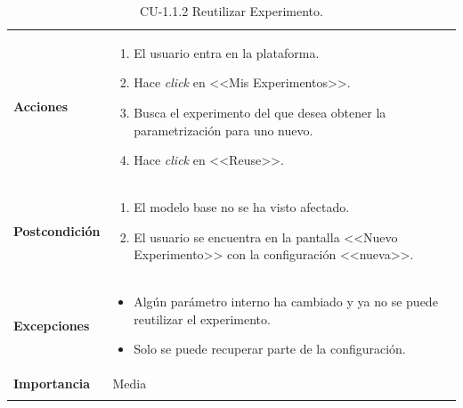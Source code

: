 \begin{longtable}[H]{@{}ll@{}}
\begin{minipage}[t]{0.23\columnwidth}\raggedright\strut
\textbf{Acciones}\strut
\end{minipage} & \begin{minipage}[t]{0.71\columnwidth}\raggedright\strut
\begin{enumerate}
\def\labelenumi{\arabic{enumi}.}
\tightlist
\item El usuario entra en la plataforma.
\item Hace \textit{click} en <<Mis Experimentos>>.
\item Busca el experimento del que desea obtener la parametrización para uno nuevo.
\item Hace \textit{click} en <<Reuse>>.
\end{enumerate}\strut
\end{minipage}\tabularnewline
\begin{minipage}[t]{0.23\columnwidth}\raggedright\strut
\textbf{Postcondición}\strut
\end{minipage} & \begin{minipage}[t]{0.71\columnwidth}\raggedright\strut
\begin{enumerate}
\tightlist
\item El modelo base no se ha visto afectado.
\item El usuario se encuentra en la pantalla <<Nuevo Experimento>> con la configuración <<nueva>>.
\end{enumerate}\strut
\end{minipage}\tabularnewline
\begin{minipage}[t]{0.23\columnwidth}\raggedright\strut
\textbf{Excepciones}\strut
\end{minipage} & \begin{minipage}[t]{0.71\columnwidth}\raggedright\strut
\begin{itemize}
\tightlist
\item Algún parámetro interno ha cambiado y ya no se puede reutilizar el experimento.
\item Solo se puede recuperar parte de la configuración.
\end{itemize}\strut
\end{minipage}\tabularnewline
\begin{minipage}[t]{0.23\columnwidth}\raggedright\strut
\textbf{Importancia}\strut
\end{minipage} & \begin{minipage}[t]{0.71\columnwidth}\raggedright\strut
Media\strut
\end{minipage}\tabularnewline
\bottomrule
\caption{CU-1.1.2 Reutilizar Experimento.}
\end{longtable}